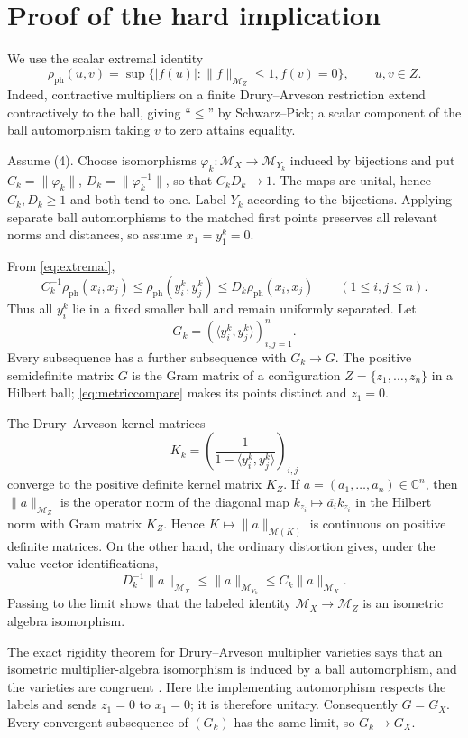\documentclass[11pt]{article}
\newcommand{\M}{\mathcal M}
\newcommand{\C}{\mathbb C}
\newcommand{\ph}{\rho_{\mathrm{ph}}}
\begin{document}
\section{Proof of the hard implication}

We use the scalar extremal identity
\begin{equation}\label{eq:extremal}
 \ph(u,v)=\sup\{|f(u)|:\|f\|_{\M_Z}\le1, f(v)=0\},\qquad u,v\in Z.
\end{equation}
Indeed, contractive multipliers on a finite Drury--Arveson restriction extend
contractively to the ball, giving ``$\le$'' by Schwarz--Pick; a scalar
component of the ball automorphism taking $v$ to zero attains equality.

Assume (4).  Choose isomorphisms $\varphi_k:\M_X\to\M_{Y_k}$ induced by
bijections and put $C_k=\|\varphi_k\|$, $D_k=\|\varphi_k^{-1}\|$, so that
$C_kD_k\to1$.  The maps are unital, hence $C_k,D_k\ge1$ and both tend to
one.  Label $Y_k$ according to the bijections.  Applying separate ball
automorphisms to the matched first points preserves all relevant norms and
distances, so assume $x_1=y_1^k=0$.

From \eqref{eq:extremal},
\begin{equation}\label{eq:metriccompare}
 C_k^{-1}\ph(x_i,x_j)\le \ph(y_i^k,y_j^k)
 \le D_k\ph(x_i,x_j)\qquad(1\le i,j\le n).
\end{equation}
Thus all $y_i^k$ lie in a fixed smaller ball and remain uniformly separated.
Let
\[
 G_k=(\langle y_i^k,y_j^k\rangle)_{i,j=1}^n.
\]
Every subsequence has a further subsequence with $G_k\to G$.  The positive
semidefinite matrix $G$ is the Gram matrix of a configuration
$Z=\{z_1,\ldots,z_n\}$ in a Hilbert ball; \eqref{eq:metriccompare} makes its
points distinct and $z_1=0$.

The Drury--Arveson kernel matrices
\[
 K_k=\left(\frac1{1-\langle y_i^k,y_j^k\rangle}\right)_{i,j}
\]
converge to the positive definite kernel matrix $K_Z$.  If
$a=(a_1,\ldots,a_n)\in\C^n$, then $\|a\|_{\M_Z}$ is the operator norm of
the diagonal map $k_{z_i}\mapsto\overline{a_i}k_{z_i}$ in the Hilbert norm
with Gram matrix $K_Z$.  Hence $K\mapsto\|a\|_{\M(K)}$ is continuous on
positive definite matrices.  On the other hand, the ordinary distortion
gives, under the value-vector identifications,
\[
 D_k^{-1}\|a\|_{\M_X}\le \|a\|_{\M_{Y_k}}
 \le C_k\|a\|_{\M_X}.
\]
Passing to the limit shows that the labeled identity
$\M_X\to\M_Z$ is an isometric algebra isomorphism.

The exact rigidity theorem for Drury--Arveson multiplier varieties says that
an isometric multiplier-algebra isomorphism is induced by a ball
automorphism, and the varieties are congruent \cite{DRS,OPS}.  Here the
implementing automorphism respects the labels and sends $z_1=0$ to $x_1=0$;
it is therefore unitary.  Consequently $G=G_X$.  Every convergent
subsequence of $(G_k)$ has the same limit, so $G_k\to G_X$.
\end{document}
